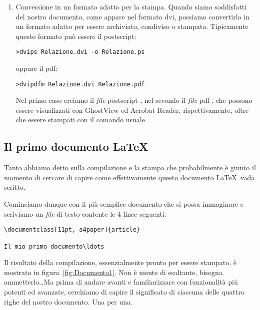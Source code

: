 \begin{enumerate}
{{Se si usano editor di testo con funzionalit\`a specifiche, essi includono
spesso dei bottoni per compiere l'operazione automaticamente.
}
si utilizza tipicamente il comando :
\begin{verbatim}
>xdvi Relazione.dvi &
\end{verbatim}
}
\item{
Conversione in un formato adatto per la stampa. Quando siamo soddisfatti del
nostro documento, come appare nel formato dvi, possiamo convertirlo in un
formato adatto per essere archiviato, condiviso o stampato. Tipicamente questo
formato pu\`o essere il postscript:
\begin{verbatim}
>dvips Relazione.dvi -o Relazione.ps
\end{verbatim}
oppure il pdf:
\begin{verbatim}
>dvipdfm Relazione.dvi Relazione.pdf
\end{verbatim}
Nel primo caso creiamo il \emph{file} postscript , nel
secondo il \emph{file} pdf , che possono essere
visualizzati con GhostView ed Acrobat Reader, rispettivamente, oltre che
essere stampati con il comando usuale.
}
\end{enumerate}


\subsection{Il primo documento \LaTeX}
\label{sec:Documento1}

Tanto abbiamo detto sulla compilazione e la stampa che probabilmente \`e
giunto il momento di cercare di capire come effettivamente questo documento
\LaTeX\ vada scritto.

Cominciamo dunque con il pi\`u semplice documento che si possa immaginare
e scriviamo un \emph{file} di testo contente le $4$ linee seguenti:
\begin{verbatim}
\documentclass[11pt, a4paper]{article}

Il mio primo documento\ldots

\end{verbatim}
Il risultato della compilazione, essenzialmente pronto per essere stampato,
\`e mostrato in figura~\ref{fig:Documento1}.
Non \`e niente di esaltante, bisogna ammetterlo\ldots Ma prima di andare
avanti e familiarizzare con funzionalit\`a pi\`u potenti ed avanzate,
cerchiamo di capire il significato di ciascuna delle quattro righe del nostro
documento. Una per una.

